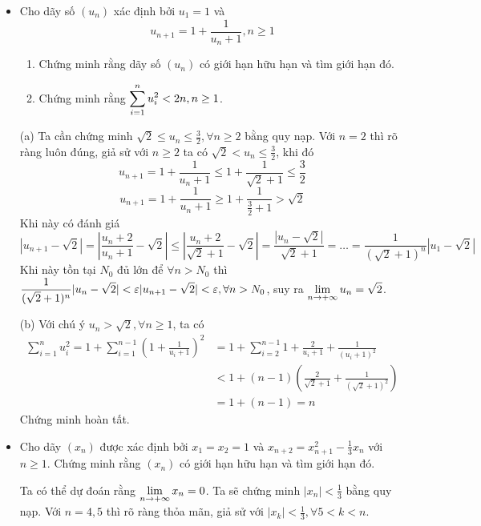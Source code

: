 \documentclass[11pt]{scrartcl}
\begin{document}
\begin{itemize}[label=, leftmargin=0em, itemsep=0.5em]
\begin{sol}
        (b) Ta có 
        \(
        a_{n + 1} \geq \sqrt{2n + 1 + \frac{1}{n}} 
        \). Cho $n \to +\infty$ thì ta được $\dlim a_n = +\infty$.
    \end{sol}
    \item \begin{bt}
        Cho dãy số $(u_n)$ xác định bởi $u_1 = 1$ và $$u_{n + 1} = 1 + \frac{1}{u_n + 1}, n \geq 1$$
        \begin{enumerate}[label=(\alph*)]
            \item Chứng minh rằng dãy số $(u_n)$ có giới hạn hữu hạn và tìm giới hạn đó.
            \item Chứng minh rằng $\displaystyle\sum_{i = 1}^n u_i^2 < 2n, n \geq 1$.
        \end{enumerate}
    \end{bt}
    \begin{sol}
        (a) Ta cần chứng minh $\sqrt{2} \leq u_n \leq \frac{3}{2}, \forall n \geq 2$ bằng quy nạp. Với $n = 2$ thì rõ ràng luôn đúng, giả sử với $n\geq 2$ ta có $\sqrt{2} < u_{n} \leq \frac{3}{2}$, khi đó 
        \[
            u_{n + 1} = 1 + \frac{1}{u_n + 1} \leq 1 + \frac{1}{\sqrt{2} + 1}  \leq \frac{3}{2}
        \]
        \[
            u_{n + 1} = 1 + \frac{1}{u_n + 1} \geq 1 + \frac{1}{\frac{3}{2} + 1} > \sqrt{2}
        \]
        Khi này có đánh giá 
        \[
        |u_{n + 1} - \sqrt{2}| = \left|\frac{u_{n} + 2}{u_n + 1} -\sqrt{2}\right| \leq \left|\frac{u_n + 2}{\sqrt{2} + 1} - \sqrt{2}\right| = \frac{\left|u_n - \sqrt{2}\right|}{\sqrt{2} + 1} =\dots = \frac{1}{(\sqrt{2} + 1)^n}|u_1 -\sqrt{2}|
        \]
        Khi này tồn tại $N_0$ đủ lớn để $\forall n > N_0$ thì $\frac{1}{(\sqrt{2} + 1)^n}|u_n -\sqrt{2}| < \varepsilon \ra |u_{n + 1} - \sqrt{2}| < \varepsilon, \forall n > N_0$, suy ra $\displaystyle\lim_{n \to +\infty} u_n = \sqrt{2}$.

        (b) Với chú ý $u_{n} > \sqrt{2},\forall n\geq 1$, ta có 
        \[
        \begin{aligned}
            \sum_{i = 1}^n u_i^2 = 1 + \sum_{i = 1}^{n - 1} \left(1 + \frac{1}{u_i+ 1}\right)^2 &= 1 + \sum_{i = 2}^{n - 1}1 + \frac{2}{u_i + 1} + \frac{1}{(u_i + 1)^2}\\
            &< 1  + \left(n -1 \right)\left(\frac{2}{\sqrt{2} + 1} + \frac{1}{(\sqrt{2} + 1)^2}\right)\\
            &=1 + (n - 1) = n
        \end{aligned}
        \]
        Chứng minh hoàn tất.
    \end{sol}
    \item \begin{bt}
        Cho dãy $(x_n)$ được xác định bởi $x_1 = x_2 = 1$ và $x_{n + 2} = x_{n + 1}^2 - \frac{1}{3}x_n$ với $n \geq 1$. Chứng minh rằng $(x_n)$ có giới hạn hữu hạn và tìm giới hạn đó.
    \end{bt}
    \begin{sol}
        Ta có thể dự đoán rằng $\displaystyle\lim_{n \to +\infty} x_n = 0$. Ta sẽ chứng minh $|x_n| < \frac{1}{3}$ bằng quy nạp. Với $n =4,5$ thì rõ ràng thỏa mãn, giả sử với $|x_{k}| < \frac{1}{3}, \forall 5 <k < n$.
        

\end{sol}
\end{itemize}
\end{document}
